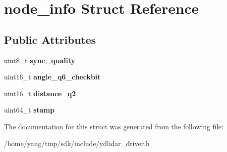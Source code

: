 \hypertarget{structnode__info}{}\section{node\+\_\+info Struct Reference}
\label{structnode__info}
\subsection*{Public Attributes}
\begin{DoxyCompactItemize}
\item 
uint8\+\_\+t {\bfseries sync\+\_\+quality}\hypertarget{structnode__info_a45f5ed4efbe416d43171d63c669f02da}{}\label{structnode__info_a45f5ed4efbe416d43171d63c669f02da}

\item 
uint16\+\_\+t {\bfseries angle\+\_\+q6\+\_\+checkbit}\hypertarget{structnode__info_a73e1d282a573f3daa74332fe29b90a26}{}\label{structnode__info_a73e1d282a573f3daa74332fe29b90a26}

\item 
uint16\+\_\+t {\bfseries distance\+\_\+q2}\hypertarget{structnode__info_a82eaf27a6196e803d3618c83b052f78c}{}\label{structnode__info_a82eaf27a6196e803d3618c83b052f78c}

\item 
uint64\+\_\+t {\bfseries stamp}\hypertarget{structnode__info_a92f30331da1d7d95f9998dcd3886574c}{}\label{structnode__info_a92f30331da1d7d95f9998dcd3886574c}

\end{DoxyCompactItemize}


The documentation for this struct was generated from the following file\+:\begin{DoxyCompactItemize}
\item 
/home/yang/tmp/sdk/include/ydlidar\+\_\+driver.\+h\end{DoxyCompactItemize}
